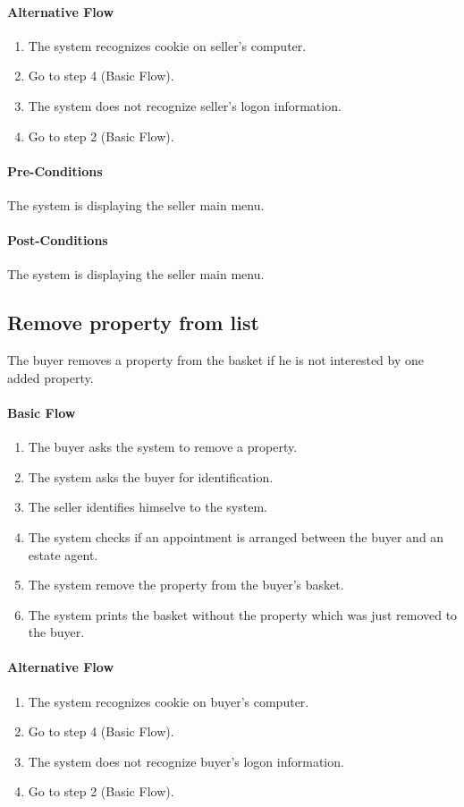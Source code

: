 \documentclass[a4paper,12pt]{article}
\begin{document}
\paragraph{Alternative Flow}
\begin{enumerate}
\item The system recognizes cookie on seller's computer. 
\item Go to step 4 (Basic Flow).
\item The system does not recognize seller's logon information.
\item Go to step 2 (Basic Flow).
\end{enumerate}
\paragraph{Pre-Conditions}
The system is displaying the seller main menu.
\paragraph{Post-Conditions}
The system is displaying the seller main menu.

\subsection{Remove property from list}

The buyer removes a property from the basket if he is not interested by one added property.

\paragraph{Basic Flow}
\begin{enumerate}
\item The buyer asks the system to remove a property.
\item The system asks the buyer for identification.
\item The seller identifies himselve to the system.
\item The system checks if an appointment is arranged between the buyer and an estate agent.
\item The system remove the property from the buyer's basket.
\item The system prints the basket without the property which was just removed to the buyer.
\end{enumerate}
\paragraph{Alternative Flow}
\begin{enumerate}
\item The system recognizes cookie on buyer's computer. 
\item Go to step 4 (Basic Flow).
\item The system does not recognize buyer's logon information.
\item Go to step 2 (Basic Flow).
\end{enumerate}
\end{document}

